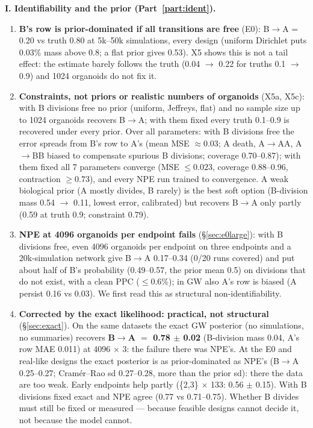 \documentclass[10pt,a4paper]{article}
\begin{document}
\textbf{I. Identifiability and the prior (Part~\ref{part:ident}).}
\begin{enumerate}[leftmargin=1.4em]
\item \textbf{B's row is prior-dominated if all transitions are free} (E0): B$\to$A = 0.20 vs truth 0.80 at 5k--50k simulations, every design (uniform Dirichlet puts 0.03\% mass above 0.8; a flat prior gives 0.53). X5 shows this is not a tail effect: the estimate barely follows the truth (0.04 $\to$ 0.22 for truths 0.1 $\to$ 0.9) and 1024 organoids do not fix it.
\item \textbf{Constraints, not priors or realistic numbers of organoids} (X5a, X5c): with B divisions free no prior (uniform, Jeffreys, flat) and no sample size up to 1024 organoids recovers B$\to$A; with them fixed every truth 0.1--0.9 is recovered under every prior. Over all parameters: with B divisions free the error spreads from B's row to A's (mean MSE $\approx 0.03$; A death, A$\to$AA, A$\to$BB biased to compensate spurious B divisions; coverage 0.70--0.87); with them fixed all 7 parameters converge (MSE $\le 0.023$, coverage 0.88--0.96, contraction $\ge 0.73$), and every NPE run trained to convergence. A weak biological prior (A mostly divides, B rarely) is the best soft option (B-division mass 0.54 $\to$ 0.11, lowest error, calibrated) but recovers B$\to$A only partly (0.59 at truth 0.9; constraint 0.79).
\item \textbf{NPE at 4096 organoids per endpoint fails} (\S\ref{sec:e0large}): with B divisions free, even 4096 organoids per endpoint on three endpoints and a 20k-simulation network give B$\to$A 0.17--0.34 (0/20 runs covered) and put about half of B's probability (0.49--0.57, the prior mean 0.5) on divisions that do not exist, with a clean PPC ($\le 0.6\%$); in GW also A's row is biased (A persist 0.16 vs 0.03). We first read this as structural non-identifiability.
\item \textbf{Corrected by the exact likelihood: practical, not structural} (\S\ref{sec:exact}). On the same datasets the exact GW posterior (no simulations, no summaries) recovers \textbf{B$\to$A $=$ 0.78 $\pm$ 0.02} (B-division mass 0.04, A's row MAE 0.011) at 4096 $\times$ 3: the failure there was NPE's. At the E0 and real-like designs the exact posterior is as prior-dominated as NPE's (B$\to$A 0.25--0.27; Cram\'er--Rao sd 0.27--0.28, more than the prior sd): there the data are too weak. Early endpoints help partly (\{2,3\} $\times$ 133: 0.56 $\pm$ 0.15). With B divisions fixed exact and NPE agree (0.77 vs 0.71--0.75). Whether B divides must still be fixed or measured --- because feasible designs cannot decide it, not because the model cannot.
\end{enumerate}
\end{document}
